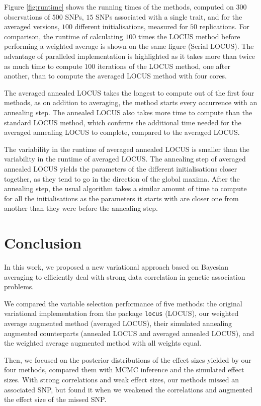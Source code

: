 \documentclass[a4paper, 11pt]{report}
\numberwithin{equation}{chapter}
\begin{document}
Figure \ref{fig:runtime} shows the running times of the methods, computed on $300$ observations of $500$ SNPs, $15$ SNPs associated with a single trait, and for the averaged versions, $100$ different initialisations, measured for $50$ replications. For comparison, the runtime of calculating $100$ times the LOCUS method before performing a weighted average is shown on the same figure (Serial LOCUS). The advantage of paralleled implementation is highlighted as it takes more than twice as much time to compute $100$ iterations of the LOCUS method, one after another, than to compute the averaged LOCUS method with four cores.

The averaged annealed LOCUS takes the longest to compute out of the first four methods, as on addition to averaging, the method starts every occurrence with an annealing step. The annealed LOCUS also takes more time to compute than the standard LOCUS method, which confirms the additional time needed for the averaged annealing LOCUS to complete, compared to the averaged LOCUS.

The variability in the runtime of averaged annealed LOCUS is smaller than the variability in the runtime of averaged LOCUS. The annealing step of averaged annealed LOCUS yields the parameters of the different initialisations closer together, as they tend to go in the direction of the global maxima. After the annealing step, the usual algorithm takes a similar amount of time to compute for all the initialisations as the parameters it starts with are closer one from another than they were before the annealing step.
%
%
%
%
%
%
\newpage
\chapter{Conclusion}
In this work, we proposed a new variational approach based on Bayesian averaging to efficiently deal with strong data correlation in genetic association problems.

We compared the variable selection performance of five methods: the original variational implementation from the package \texttt{locus} (LOCUS), our weighted average augmented method (averaged LOCUS), their simulated annealing augmented counterparts (annealed LOCUS and averaged annealed LOCUS), and the weighted average augmented method with all weights equal.

Then, we focused on the posterior distributions of the effect sizes yielded by our four methods, compared them with MCMC inference and the simulated effect sizes. With strong correlations and weak effect sizes, our methods missed an associated SNP, but found it when we weakened the correlations and augmented the effect size of the missed SNP.
\end{document}
